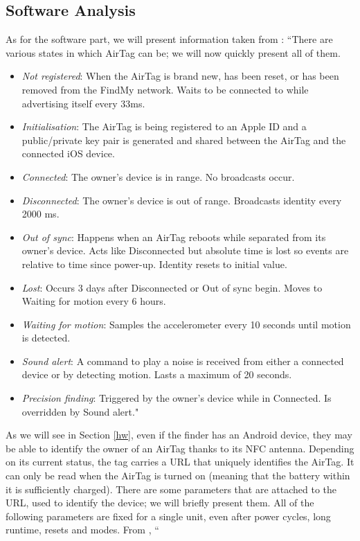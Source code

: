\documentclass[english]{article}
\begin{document}
\subsection{Software Analysis}\label{sec:beacons}
As for the software part, we will present information taken from \cite{reverse}: ``There are various states in which AirTag can be; we will now quickly present all of them.
\begin{itemize}
  \item \textit{Not registered}: When the AirTag is brand new, has been reset, or has been removed from the FindMy network. Waits to be connected to while advertising itself every 33ms.
  \item \textit{Initialisation}: The AirTag is being registered to an Apple ID and a public/private key pair is generated and shared between the AirTag and the connected iOS device.
  \item \textit{Connected}: The owner’s device is in range. No broadcasts occur.
  \item \textit{Disconnected}: The owner’s device is out of range. Broadcasts identity every 2000 ms.
  \item \textit{Out of sync}: Happens when an AirTag reboots while separated from its owner’s device. Acts like Disconnected but absolute time is lost so events are relative to time since power-up. Identity resets to initial value.
  \item \textit{Lost}: Occurs 3 days after Disconnected or Out of sync begin. Moves to Waiting for motion every 6 hours.
  \item \textit{Waiting for motion}: Samples the accelerometer every 10 seconds until motion is detected.
  \item \textit{Sound alert}: A command to play a noise is received from either a connected device or by detecting motion. Lasts a maximum of 20 seconds.
  \item \textit{Precision finding}: Triggered by the owner’s device while in Connected. Is overridden by Sound alert."
\end{itemize}
As we will see in Section \ref{hw}, even if the finder has an Android device, they may be able to identify the owner of an AirTag thanks to its NFC antenna. Depending on its current status, the tag carries a URL that uniquely identifies the AirTag. It can only be read when the AirTag is turned on (meaning that the battery within it is sufficiently charged). There are some parameters that are attached to the URL, used to identify the device; we will briefly present them. All of the following parameters are fixed for a single unit, even after power cycles, long runtime, resets and modes. From \cite{reverse}, ``
\end{document}
